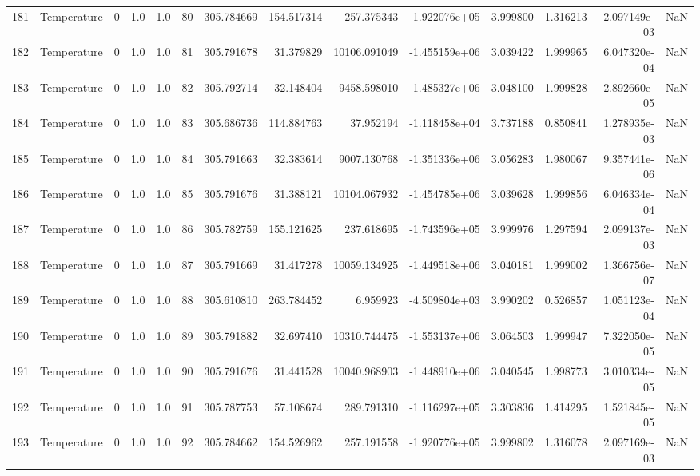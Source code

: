 \begin{tabular}{llrrrrrrrrrrrr}
181 &  Temperature &       0 &  1.0 &  1.0 &   80 &  305.784669 &   154.517314 &     257.375343 & -1.922076e+05 &  3.999800 &  1.316213 &  2.097149e-03 &      NaN \\
182 &  Temperature &       0 &  1.0 &  1.0 &   81 &  305.791678 &    31.379829 &   10106.091049 & -1.455159e+06 &  3.039422 &  1.999965 &  6.047320e-04 &      NaN \\
183 &  Temperature &       0 &  1.0 &  1.0 &   82 &  305.792714 &    32.148404 &    9458.598010 & -1.485327e+06 &  3.048100 &  1.999828 &  2.892660e-05 &      NaN \\
184 &  Temperature &       0 &  1.0 &  1.0 &   83 &  305.686736 &   114.884763 &      37.952194 & -1.118458e+04 &  3.737188 &  0.850841 &  1.278935e-03 &      NaN \\
185 &  Temperature &       0 &  1.0 &  1.0 &   84 &  305.791663 &    32.383614 &    9007.130768 & -1.351336e+06 &  3.056283 &  1.980067 &  9.357441e-06 &      NaN \\
186 &  Temperature &       0 &  1.0 &  1.0 &   85 &  305.791676 &    31.388121 &   10104.067932 & -1.454785e+06 &  3.039628 &  1.999856 &  6.046334e-04 &      NaN \\
187 &  Temperature &       0 &  1.0 &  1.0 &   86 &  305.782759 &   155.121625 &     237.618695 & -1.743596e+05 &  3.999976 &  1.297594 &  2.099137e-03 &      NaN \\
188 &  Temperature &       0 &  1.0 &  1.0 &   87 &  305.791669 &    31.417278 &   10059.134925 & -1.449518e+06 &  3.040181 &  1.999002 &  1.366756e-07 &      NaN \\
189 &  Temperature &       0 &  1.0 &  1.0 &   88 &  305.610810 &   263.784452 &       6.959923 & -4.509804e+03 &  3.990202 &  0.526857 &  1.051123e-04 &      NaN \\
190 &  Temperature &       0 &  1.0 &  1.0 &   89 &  305.791882 &    32.697410 &   10310.744475 & -1.553137e+06 &  3.064503 &  1.999947 &  7.322050e-05 &      NaN \\
191 &  Temperature &       0 &  1.0 &  1.0 &   90 &  305.791676 &    31.441528 &   10040.968903 & -1.448910e+06 &  3.040545 &  1.998773 &  3.010334e-05 &      NaN \\
192 &  Temperature &       0 &  1.0 &  1.0 &   91 &  305.787753 &    57.108674 &     289.791310 & -1.116297e+05 &  3.303836 &  1.414295 &  1.521845e-05 &      NaN \\
193 &  Temperature &       0 &  1.0 &  1.0 &   92 &  305.784662 &   154.526962 &     257.191558 & -1.920776e+05 &  3.999802 &  1.316078 &  2.097169e-03 &      NaN \\

\end{tabular}
